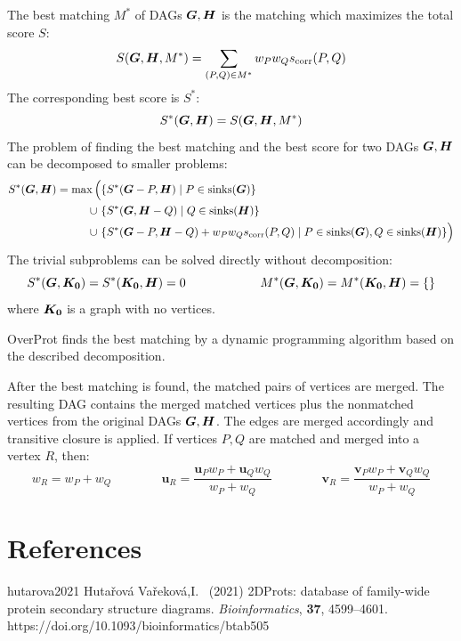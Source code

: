 \documentclass{article}
\begin{document}
The best matching \(M^*\) of DAGs \(\boldsymbol{G}, \boldsymbol{H}\) is the matching which maximizes 
the total score \(S\):
  \[  S(\boldsymbol{G}, \boldsymbol{H}, M^*) = \sum_{(P, Q) \in M^*} w_{P} w_{Q} s_\mathrm{corr}(P, Q)  \]
The corresponding best score is \(S^*\):
  \[  S^*(\boldsymbol{G}, \boldsymbol{H}) = S(\boldsymbol{G}, \boldsymbol{H}, M^*)  \]
The problem of finding the best matching and the best score 
for two DAGs \(\boldsymbol{G}, \boldsymbol{H}\) can be decomposed 
to smaller problems:
  \[ \begin{aligned}
    S^*(\boldsymbol{G}, \boldsymbol{H}) = \max\Big( & \{ S^*(\boldsymbol{G}-P, \boldsymbol{H}) \mid P \in \mathrm{sinks}(\boldsymbol{G}) \} \\
                                \cup\     & \{ S^*(\boldsymbol{G}, \boldsymbol{H}-Q) \mid Q \in \mathrm{sinks}(\boldsymbol{H}) \} \\
                                \cup\     & \{ S^*(\boldsymbol{G}-P, \boldsymbol{H}-Q) + w_{P} w_{Q} s_\mathrm{corr}(P, Q) \mid P \in \mathrm{sinks}(\boldsymbol{G}), Q \in \mathrm{sinks}(\boldsymbol{H}) \} \Big)  
  \end{aligned} \]
The trivial subproblems can be solved directly without decomposition: 
  \[  S^*(\boldsymbol{G}, \boldsymbol{K_0}) = S^*(\boldsymbol{K_0}, \boldsymbol{H}) = 0  \qquad \qquad \qquad  
      M^*(\boldsymbol{G}, \boldsymbol{K_0}) = M^*(\boldsymbol{K_0}, \boldsymbol{H}) = \{\}  
  \]
where \(\boldsymbol{K_0}\) is a graph with no vertices.

OverProt finds the best matching by a dynamic programming 
algorithm based on the described decomposition.

After the best matching is found, the matched pairs of vertices are merged. 
The resulting DAG contains the merged matched vertices 
plus the nonmatched vertices from the original DAGs \(\boldsymbol{G}, \boldsymbol{H}\).
The edges are merged accordingly and transitive closure is applied.
If vertices \(P, Q\) are matched and merged into a vertex \(R\), then:
  \[  w_R = w_P + w_Q  \qquad\qquad
      \mathbf{u}_R = \frac{\mathbf{u}_P w_P + \mathbf{u}_Q w_Q}{w_P + w_Q}  \qquad\qquad
      \mathbf{v}_R = \frac{\mathbf{v}_P w_P + \mathbf{v}_Q w_Q}{w_P + w_Q}  
  \]



\section{References}

\myreference
{hutarova2021}
{Hutařová Vařeková,I. \etal\ (2021) 
2DProts: database of family-wide protein secondary structure diagrams. 
\emph{Bioinformatics}, \textbf{37}, 4599--4601.}
{https://doi.org/10.1093/bioinformatics/btab505}
\end{document}
